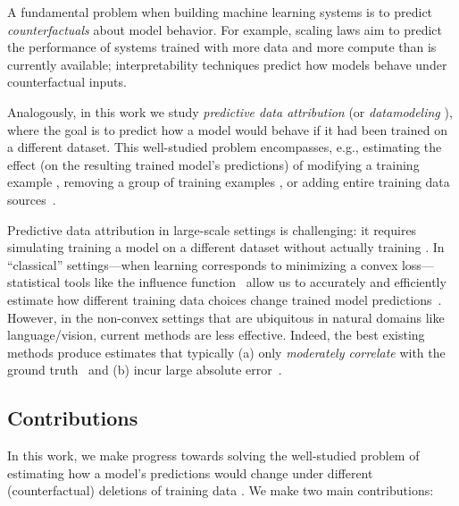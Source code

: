 A fundamental problem when building machine learning systems is to
predict {\em counterfactuals} about model behavior. For example, scaling laws
\citep{kaplan2020scaling,hashimoto2021model,muennighoff2023scaling}
aim to predict the performance of systems trained with more data and
more compute than
is currently available; interpretability techniques
\citep{kim2018interpretability} predict how models behave under counterfactual
inputs.

Analogously, in this work we study {\em predictive data attribution}
(or {\em datamodeling} \citep{ilyas2022datamodels}),
where the goal is to predict how a model would behave if it
had been trained on a different dataset.
This well-studied problem encompasses, e.g., estimating the effect
(on the resulting trained model's predictions) of modifying a training example
\citep{koh2017understanding}, removing a group of
training examples \citep{koh2019accuracy,bae2022if,park2023trak}, or
adding entire training data sources~\citep{ley2024generalized}.

Predictive data attribution in large-scale settings is challenging: it
requires simulating training a model on a different
dataset without actually training
\citep{guu2023simfluence,ilyas2024data}.
In ``classical'' settings---when learning corresponds to minimizing a
convex loss---statistical tools
like the influence function~\citep{hampel1947influence}
allow us to accurately and
efficiently estimate how different training data choices change trained model
predictions~\citep{rad2018scalable,koh2019accuracy,giordano2019swiss}.
However, in the non-convex settings that are ubiquitous in natural
domains like language/vision, current methods
are less effective. Indeed, the best existing methods produce
estimates that typically (a)
only {\em moderately correlate} with the ground
truth~\citep{basu2021influence,bae2022if,park2023trak} and (b)
incur large absolute error~\citep{bae2022if}.


\subsection{Contributions}
In this work, we make progress towards solving the
well-studied problem of estimating how a model's
predictions would change under different
(counterfactual) deletions of training data
\citep{koh2017understanding,bae2022if,schioppa2022scaling,park2023trak,bae2024training}.
We make two main contributions:

